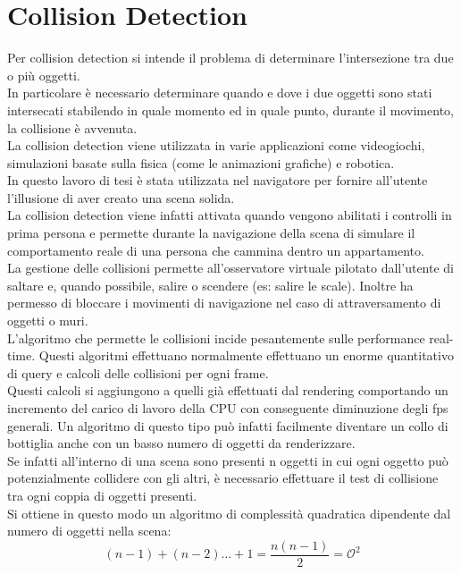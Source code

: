 \section{Collision Detection}
\label{sec:chapter_navigazione_scena_collision_detec}

Per collision detection si intende il problema di determinare l’intersezione tra due o più oggetti. 
\\
In particolare è necessario determinare quando e dove i due oggetti sono stati intersecati stabilendo in quale momento ed in quale punto, durante il movimento, la collisione è avvenuta.
\\
La collision detection viene utilizzata in varie applicazioni come videogiochi, simulazioni basate sulla fisica (come le animazioni grafiche) e robotica.
\\
In questo lavoro di tesi è stata utilizzata nel navigatore per fornire all’utente l’illusione di aver creato una scena solida.
\\
La collision detection viene infatti attivata quando vengono abilitati i controlli in prima persona e permette durante la navigazione della scena di simulare il comportamento reale di una persona che cammina dentro un appartamento.
\\
La gestione delle collisioni permette all’osservatore virtuale pilotato dall’utente di saltare e, quando possibile, salire o scendere (es: salire le scale). Inoltre ha permesso di bloccare i movimenti di navigazione nel caso di attraversamento di oggetti o muri.
\\
L’algoritmo che permette le collisioni incide pesantemente sulle performance real-time.
Questi algoritmi effettuano normalmente effettuano un enorme quantitativo di query e calcoli delle collisioni per ogni frame. 
\\
Questi calcoli si aggiungono a quelli già effettuati dal rendering comportando un incremento del carico di lavoro della CPU con conseguente diminuzione degli fps generali. Un algoritmo di questo tipo può infatti facilmente diventare un collo di bottiglia anche con un basso numero di oggetti da renderizzare.
\\
Se infatti all’interno di una scena sono presenti n oggetti in cui ogni oggetto può potenzialmente collidere con gli altri, è necessario effettuare il test di collisione tra ogni coppia di oggetti presenti. 
\\
Si ottiene in questo modo un algoritmo di complessità quadratica  dipendente dal numero di oggetti nella scena:
\begin{equation}
(n - 1) + (n - 2) ... + 1 = \frac{n(n - 1)}{2} = \mathcal{O}^2
\end{equation}
